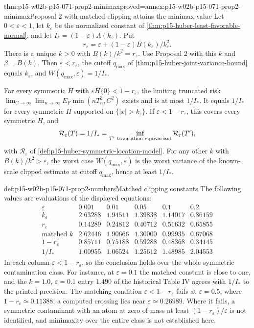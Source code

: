 \begin{hbtheorem}{thm:p15-w02b-p15-071-prop2-minimax}{proved=annex:p15-w02b-p15-071-prop2-minimax}{Proposal 2 with matched clipping attains the minimax value}
Let \(0<\varepsilon<1\), let \(k_\varepsilon\) be the normalized constant
of \cref{thm:p15-huber-least-favorable-normal}, and let
\(I_*=(1-\varepsilon)A(k_\varepsilon)\). Put
\[
 r_\varepsilon=\varepsilon+(1-\varepsilon)B(k_\varepsilon)/k_\varepsilon^2 .
\]
There is a unique \(k>0\) with \(B(k)/k^2=r_\varepsilon\). Use
Proposal 2 with this \(k\) and \(\beta=B(k)\). Then
\(\varepsilon<r_\varepsilon\), the cutoff \(q_{\max}\) of
\cref{thm:p15-huber-joint-variance-bound} equals \(k_\varepsilon\), and
\(W(q_{\max},\varepsilon)=1/I_*\).

For every symmetric \(H\) with \(\varepsilon H\{0\}<1-r_\varepsilon\),
the limiting truncated risk
\(\lim_{C\to\infty}\lim_{n\to\infty}E_F\min(nT_n^2,C^2)\) exists and is
at most \(1/I_*\). It equals \(1/I_*\) for every symmetric \(H\)
supported on \(\{|x|>k_\varepsilon\}\).
If \(\varepsilon<1-r_\varepsilon\), this covers every symmetric \(H\), and
\[
 \mathcal R_\varepsilon(T)=1/I_*=
 \inf_{T'\ {\rm translation\ equivariant}}\mathcal R_\varepsilon(T'),
\]
with \(\mathcal R_\varepsilon\) of \cref{def:p15-huber-symmetric-location-model}.
For any other \(k\) with \(B(k)/k^2>\varepsilon\), the worst case
\(W(q_{\max},\varepsilon)\) is the worst variance of the known-scale
clipped estimate at cutoff \(q_{\max}\), hence at least \(1/I_*\).
\end{hbtheorem}

\begin{hbexample}{def:p15-w02b-p15-071-prop2-numbers}{Matched clipping constants}
The following values are evaluations of the displayed equations:
\[
\begin{array}{c|rrrrr}
\varepsilon&0.001&0.01&0.05&0.1&0.2\\\hline
k_\varepsilon&2.63288&1.94511&1.39838&1.14017&0.86159\\
r_\varepsilon&0.14289&0.24812&0.40712&0.51632&0.65855\\
\text{matched }k&2.62446&1.90666&1.30000&0.99935&0.67068\\
1-r_\varepsilon&0.85711&0.75188&0.59288&0.48368&0.34145\\
1/I_*&1.00955&1.06524&1.25612&1.48985&2.04553
\end{array}
\]
In each column \(\varepsilon<1-r_\varepsilon\), so the conclusion holds
over the whole symmetric contamination class. For instance, at
\(\varepsilon=0.1\) the matched constant is close to one, and the
\(k=1.0\), \(\varepsilon=0.1\) entry \(1.490\) of the historical
Table IV agrees with \(1/I_*\) to the printed precision.
The matching condition \(\varepsilon<1-r_\varepsilon\) fails at
\(\varepsilon=0.5\), where \(1-r_\varepsilon\simeq0.11388\); a computed
crossing lies near \(\varepsilon\simeq0.26989\). Where it fails, a symmetric contaminant with an
atom at zero of mass at least \((1-r_\varepsilon)/\varepsilon\) is not identified, and minimaxity over the entire
class is not established here.
\end{hbexample}

